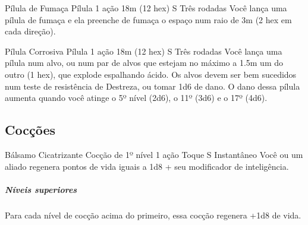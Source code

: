 \documentclass[letterpaper,twocolumn,openany]{dndbook}
\begin{document}
	\spellheader%
	{Pílula de Fumaça}
	{Pílula}
	{1 ação}
	{18m (12 hex)}
	{S}
	{Três rodadas}
	Você lança uma pílula de fumaça e ela preenche de fumaça o espaço num raio de 3m (2 hex em cada direção).
	
	\spellheader%
	{Pílula Corrosiva}
	{Pílula}
	{1 ação}
	{18m (12 hex)}
	{S}
	{Três rodadas}
	Você lança uma pílula num alvo, ou num par de alvos que estejam no máximo a 1.5m um do outro (1 hex), que explode espalhando ácido. Os alvos devem ser bem sucedidos num teste de resistência de Destreza, ou tomar 1d6 de dano. O dano dessa pílula aumenta quando você atinge o 5º nível (2d6), o 11º (3d6) e o 17º (4d6).
	
	\subsection{Cocções}
	
	\spellheader%
	{Bálsamo Cicatrizante}
	{Cocção de 1º nível}
	{1 ação}
	{Toque}
	{S}
	{Instantâneo}
	Você ou um aliado regenera pontos de vida iguais a 1d8 + seu modificador de inteligência.
		\subparagraph{Níveis superiores} Para cada nível de cocção acima do primeiro, essa cocção regenera +1d8 de vida.
	
\end{document}
